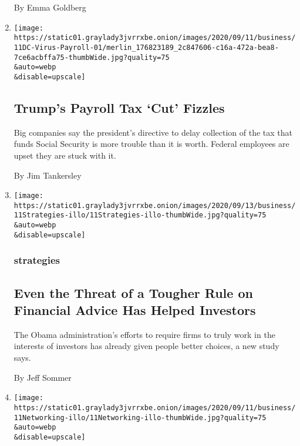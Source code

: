 \begin{enumerate}
  By Emma Goldberg
\item
  \href{/2020/09/11/business/trump-payroll-tax-cut.html}{}

  \texttt{[image: https://static01.graylady3jvrrxbe.onion/images/2020/09/11/business/11DC-Virus-Payroll-01/merlin\_176823189\_2c847606-c16a-472a-bea8-7ce6acbffa75-thumbWide.jpg?quality=75\\\&auto=webp\\\&disable=upscale]}

  \hypertarget{trumps-payroll-tax-cut-fizzles}{%
  \subsection{Trump's Payroll Tax `Cut'
  Fizzles}\label{trumps-payroll-tax-cut-fizzles}}

  Big companies say the president's directive to delay collection of the
  tax that funds Social Security is more trouble than it is worth.
  Federal employees are upset they are stuck with it.

  By Jim Tankersley
\item
  \href{/2020/09/11/business/investors-retirement-costs-threat.html}{}

  \texttt{[image: https://static01.graylady3jvrrxbe.onion/images/2020/09/13/business/11Strategies-illo/11Strategies-illo-thumbWide.jpg?quality=75\\\&auto=webp\\\&disable=upscale]}

  \hypertarget{strategies}{%
  \subsubsection{strategies}\label{strategies}}

  \hypertarget{even-the-threat-of-a-tougher-rule-on-financial-advice-has-helped-investors}{%
  \subsection{Even the Threat of a Tougher Rule on Financial Advice Has
  Helped
  Investors}\label{even-the-threat-of-a-tougher-rule-on-financial-advice-has-helped-investors}}

  The Obama administration's efforts to require firms to truly work in
  the interests of investors has already given people better choices, a
  new study says.

  By Jeff Sommer
\item
  \href{/2020/09/11/business/networking-home-coronavirus.html}{}

  \texttt{[image: https://static01.graylady3jvrrxbe.onion/images/2020/09/11/business/11Networking-illo/11Networking-illo-thumbWide.jpg?quality=75\\\&auto=webp\\\&disable=upscale]}


\end{enumerate}
